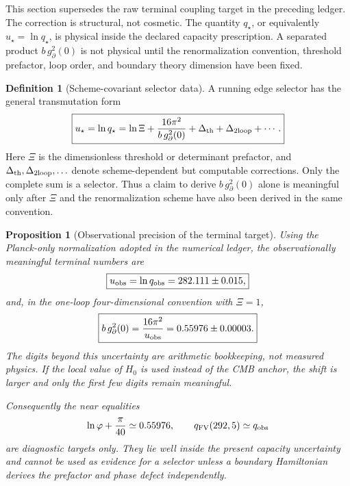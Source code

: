 \documentclass[aps,prd,reprint,nofootinbib,superscriptaddress,floatfix]{revtex4-2}
\numberwithin{equation}{section}
\theoremstyle{definition}
\newtheorem{definition}{Definition}[section]
\theoremstyle{plain}
\newtheorem{proposition}{Proposition}[section]
\begin{document}
This section supersedes the raw terminal coupling target in the preceding
ledger.  The correction is structural, not cosmetic.  The quantity
\(q_\star\), or equivalently \(u_\star=\ln q_\star\), is physical inside the
declared capacity prescription.  A separated product \(b\,g_\partial^2(0)\)
is not physical until the renormalization convention, threshold prefactor,
loop order, and boundary theory dimension have been fixed.

\begin{definition}[Scheme-covariant selector data]
A running edge selector has the general transmutation form
\begin{equation}
\boxed{
        u_\star
        =
        \ln q_\star
        =
        \ln\Xi+
        \frac{16\pi^2}{b\,g_\partial^2(0)}
        +\Delta_{\rm th}
        +\Delta_{\rm 2loop}
        +\cdots .
}
\end{equation}
Here \(\Xi\) is the dimensionless threshold or determinant prefactor, and
\(\Delta_{\rm th},\Delta_{\rm 2loop},\ldots\) denote scheme-dependent but
computable corrections.  Only the complete sum is a selector.  Thus a claim to
derive \(b\,g_\partial^2(0)\) alone is meaningful only after \(\Xi\) and the
renormalization scheme have also been derived in the same convention.
\end{definition}

\begin{proposition}[Observational precision of the terminal target]\label{prop:observational-precision}
Using the Planck-only normalization adopted in the numerical ledger,
the observationally meaningful terminal numbers are
\begin{equation}
\boxed{
        u_{\rm obs}=\ln q_{\rm obs}=282.111\pm0.015 ,
}
\end{equation}
and, in the one-loop four-dimensional convention with \(\Xi=1\),
\begin{equation}
\boxed{
        b\,g_\partial^2(0)
        =
        \frac{16\pi^2}{u_{\rm obs}}
        =
        0.55976\pm0.00003 .
}
\end{equation}
The digits beyond this uncertainty are arithmetic bookkeeping, not measured
physics.  If the local value of \(H_0\) is used instead of the CMB anchor, the
shift is larger and only the first few digits remain meaningful.

Consequently the near equalities
\[
\ln\varphi+\frac{\pi}{40}\simeq 0.55976,
\qquad
q_{\rm FV}(292,5)\simeq q_{\rm obs}
\]
are diagnostic targets only.  They lie well inside the present capacity
uncertainty and cannot be used as evidence for a selector unless a boundary
Hamiltonian derives the prefactor and phase defect independently.
\end{proposition}
\end{document}
